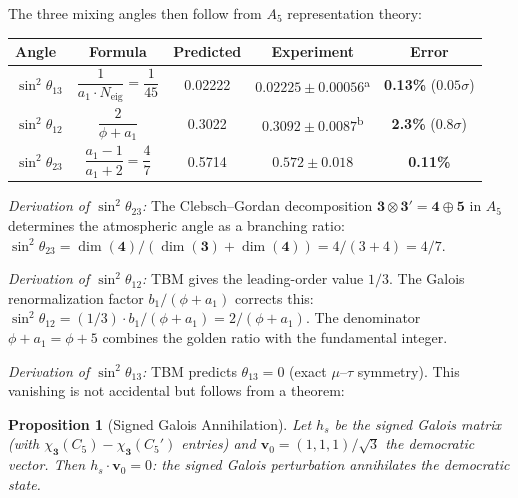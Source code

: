 \documentclass[12pt,a4paper]{article}
\newtheorem{proposition}{Proposition}
\theoremstyle{definition}
\begin{document}
The three mixing angles then follow from $A_5$ representation theory:

\begin{center}
\begin{tabular}{lcccc}
\toprule
\textbf{Angle} & \textbf{Formula} & \textbf{Predicted} & \textbf{Experiment} & \textbf{Error} \\
\midrule
$\sin^2\theta_{13}$ & $\dfrac{1}{a_1 \cdot N_{\text{eig}}} = \dfrac{1}{45}$ & 0.02222 & $0.02225 \pm 0.00056$\textsuperscript{a} & \textbf{0.13\%} ($0.05\sigma$) \\[8pt]
$\sin^2\theta_{12}$ & $\dfrac{2}{\phi + a_1}$ & 0.3022 & $0.3092 \pm 0.0087$\textsuperscript{b} & \textbf{2.3\%} ($0.8\sigma$) \\[8pt]
$\sin^2\theta_{23}$ & $\dfrac{a_1 - 1}{a_1 + 2} = \dfrac{4}{7}$ & 0.5714 & $0.572 \pm 0.018$ & \textbf{0.11\%} \\
\bottomrule
\end{tabular}
\end{center}

\noindent\textit{Derivation of $\sin^2\theta_{23}$:} The Clebsch--Gordan decomposition $\mathbf{3} \otimes \mathbf{3'} = \mathbf{4} \oplus \mathbf{5}$ in $A_5$ determines the atmospheric angle as a branching ratio: $\sin^2\theta_{23} = \dim(\mathbf{4})/(\dim(\mathbf{3}) + \dim(\mathbf{4})) = 4/(3+4) = 4/7$.

\noindent\textit{Derivation of $\sin^2\theta_{12}$:} TBM gives the leading-order value $1/3$.  The Galois renormalization factor $b_1/(\phi + a_1)$ corrects this: $\sin^2\theta_{12} = (1/3) \cdot b_1/(\phi + a_1) = 2/(\phi + a_1)$.  The denominator $\phi + a_1 = \phi + 5$ combines the golden ratio with the fundamental integer.

\noindent\textit{Derivation of $\sin^2\theta_{13}$:} TBM predicts $\theta_{13} = 0$ (exact $\mu$--$\tau$ symmetry).  This vanishing is not accidental but follows from a theorem:

\begin{proposition}[Signed Galois Annihilation]
Let $h_s$ be the signed Galois matrix (with $\chi_{\mathbf{3}}(C_5) - \chi_{\mathbf{3}}(C_5')$ entries) and $\mathbf{v}_0 = (1,1,1)/\sqrt{3}$ the democratic vector.  Then $h_s \cdot \mathbf{v}_0 = 0$: the signed Galois perturbation annihilates the democratic state.
\end{proposition}
\end{document}

